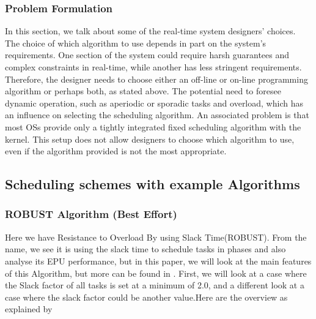 \documentclass[conference]{IEEEtran}
\begin{document}
\subsubsection{Problem Formulation}
In this section, we talk about some of the real-time system designers' choices. The choice of which algorithm to use depends in part on the system's requirements. One section of the system could require harsh guarantees and complex constraints in real-time, while another has less stringent requirements. Therefore, the designer needs to choose either an off-line or on-line programming algorithm or perhaps both, as stated above. The potential need to foresee dynamic operation, such as aperiodic or sporadic tasks and overload, which has an influence on selecting the scheduling algorithm. An associated problem is that most OSs provide only a tightly integrated fixed scheduling algorithm\cite{lennvall2003handling} with the kernel. This setup does not allow designers to choose which algorithm to use, even if the algorithm provided is not the most appropriate.
\subsection{Scheduling schemes with example Algorithms}
\subsubsection{ROBUST Algorithm (Best Effort)}
Here we have Resistance to Overload By using Slack Time(ROBUST). From the name, we see it is using the slack time to schedule tasks in phases and also analyse its EPU performance, but in this paper, we will look at the main features of this Algorithm, but more can be found in \cite{620484}. First, we will look at a case where the Slack factor of all tasks is set at a minimum of 2.0, and a different look at a case where the slack factor could be another value.Here are the overview as explained by\cite{620484}
\end{document}
